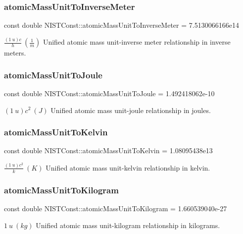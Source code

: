 \subsubsection{\texorpdfstring{atomic\+Mass\+Unit\+To\+Inverse\+Meter}{atomicMassUnitToInverseMeter}}
{\footnotesize\ttfamily const double N\+I\+S\+T\+Const\+::atomic\+Mass\+Unit\+To\+Inverse\+Meter = 7.\+5130066166e14}

$\frac{(1\ u)c}{h} \ (\frac{1}{m})$ Unified atomic mass unit-\/inverse meter relationship in inverse meters. \mbox{\label{group___atomic_mass_unit_gaea7c1916a35df8824ac6a67be3f65f33}} 
\subsubsection{\texorpdfstring{atomic\+Mass\+Unit\+To\+Joule}{atomicMassUnitToJoule}}
{\footnotesize\ttfamily const double N\+I\+S\+T\+Const\+::atomic\+Mass\+Unit\+To\+Joule = 1.\+492418062e-\/10}

$(1\ u)c^2 \ (J)$ Unified atomic mass unit-\/joule relationship in joules. \mbox{\label{group___atomic_mass_unit_gaf9c3a2dfd69d4e74cee3361abd7d7ecf}} 
\subsubsection{\texorpdfstring{atomic\+Mass\+Unit\+To\+Kelvin}{atomicMassUnitToKelvin}}
{\footnotesize\ttfamily const double N\+I\+S\+T\+Const\+::atomic\+Mass\+Unit\+To\+Kelvin = 1.\+08095438e13}

$\frac{(1\ u)c^2}{k} \ (K)$ Unified atomic mass unit-\/kelvin relationship in kelvin. \mbox{\label{group___atomic_mass_unit_gafdd40d93803d15e1ff887dc12c49ca99}} 
\subsubsection{\texorpdfstring{atomic\+Mass\+Unit\+To\+Kilogram}{atomicMassUnitToKilogram}}
{\footnotesize\ttfamily const double N\+I\+S\+T\+Const\+::atomic\+Mass\+Unit\+To\+Kilogram = 1.\+660539040e-\/27}

$1\ u\ (kg)$ Unified atomic mass unit-\/kilogram relationship in kilograms. 